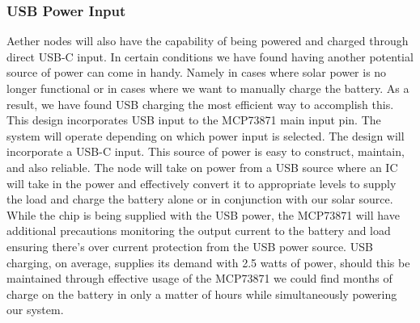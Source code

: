 \subsubsection{USB Power Input}
Aether nodes will also have the capability of being powered and charged through direct USB-C input. In certain conditions we have found having another potential source of power can come in handy. Namely in cases where solar power is no longer functional or in cases where we want to manually charge the battery. As a result, we have found USB charging the most efficient way to accomplish this. This design incorporates USB input to the MCP73871 main input pin. The system will operate depending on which power input is selected. The design will incorporate a USB-C input. This source of power is easy to construct, maintain, and also reliable. The node will take on power from a USB source where an IC will take in the power and effectively convert it to appropriate levels to supply the load and charge the battery alone or in conjunction with our solar source. While the chip is being supplied with the USB power, the MCP73871 will have additional precautions monitoring the output current to the battery and load ensuring there's over current protection from the USB power source. USB charging, on average, supplies its demand with 2.5 watts of power, should this be maintained through effective usage of the MCP73871 we could find months of charge on the battery in only a matter of hours while simultaneously powering our system.
